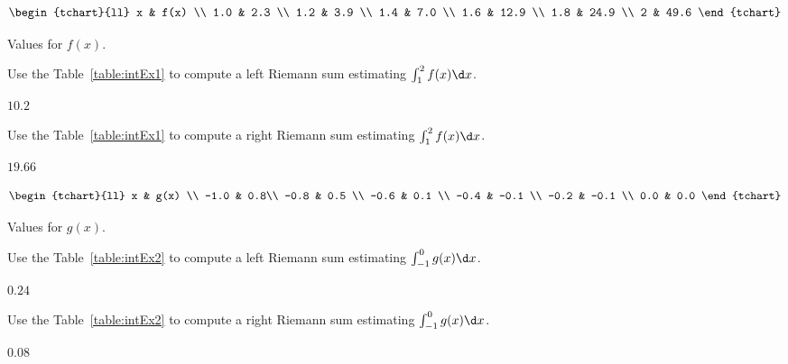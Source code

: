 \begin{exercises}

\begin{margintable}[1in]
\[
\begin{tchart}{ll}
x & f(x) \\
1.0 & 2.3 \\
1.2 & 3.9 \\ 
1.4 & 7.0 \\
1.6 & 12.9 \\
1.8 & 24.9 \\ 
2 & 49.6 
\end{tchart}
\]
\caption{Values for $f(x)$.}
\label{table:intEx1}
\end{margintable}

\begin{exercise}
Use the Table~\ref{table:intEx1} to compute a left Riemann sum
estimating $\int_1^2 f(x) \d x$.
\begin{answer}
$10.2$
\end{answer}
\end{exercise}

\begin{exercise}
Use the Table~\ref{table:intEx1} to compute a right Riemann sum
estimating $\int_1^2 f(x) \d x$.
\begin{answer}
$19.66$
\end{answer}
\end{exercise}

\begin{margintable}[1in]
\[
\begin{tchart}{ll}
x & g(x) \\
-1.0 & 0.8\\
-0.8 & 0.5 \\ 
-0.6 & 0.1 \\
-0.4 & -0.1 \\
-0.2 & -0.1 \\ 
0.0 &  0.0 
\end{tchart}
\]
\caption{Values for $g(x)$.}
\label{table:intEx2}
\end{margintable}


\begin{exercise}
Use the Table~\ref{table:intEx2} to compute a left Riemann sum
estimating $\int_{-1}^0 g(x) \d x$.
\begin{answer}
$0.24$
\end{answer}
\end{exercise}

\begin{exercise}
Use the Table~\ref{table:intEx2} to compute a right Riemann sum
estimating $\int_{-1}^0 g(x) \d x$.
\begin{answer}
$0.08$
\end{answer}
\end{exercise}


\end{exercises}
